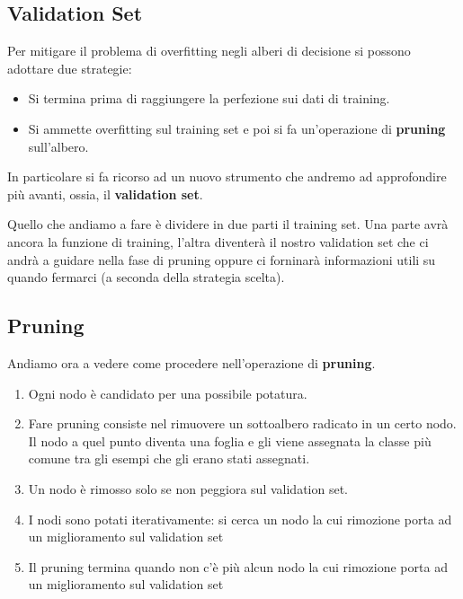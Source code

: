 \subsection{Validation Set}
Per mitigare il problema di overfitting negli alberi di decisione si possono adottare due strategie:
\begin{itemize}
	\item Si termina prima di raggiungere la perfezione sui dati di training.
	\item Si ammette overfitting sul training set e poi si fa un'operazione di \textbf{pruning} sull'albero.
\end{itemize}
In particolare si fa ricorso ad un nuovo strumento che andremo ad approfondire pi\`u avanti, ossia, il
\textbf{validation set}.

Quello che andiamo a fare \`e dividere in due parti il training set. Una parte avr\`a ancora la funzione di training,
l'altra diventer\`a il nostro validation set che ci andr\`a a guidare nella fase di pruning oppure ci forninar\`a
informazioni utili su quando fermarci (a seconda della strategia scelta).

\subsection{Pruning}
Andiamo ora a vedere come procedere nell'operazione di \textbf{pruning}.
\begin{enumerate}
	\item Ogni nodo \`e candidato per una possibile potatura.
	\item Fare pruning consiste nel rimuovere un sottoalbero radicato in un certo nodo. Il nodo a quel punto diventa una
	      foglia e gli viene assegnata la classe pi\`u comune tra gli esempi che gli erano stati assegnati.
	\item Un nodo \`e rimosso solo se non peggiora sul validation set.
	\item I nodi sono potati iterativamente: si cerca un nodo la cui rimozione porta ad un miglioramento sul validation
	      set
	\item Il pruning termina quando non c'\`e pi\`u alcun nodo la cui rimozione porta ad un miglioramento sul validation
	      set
\end{enumerate}

